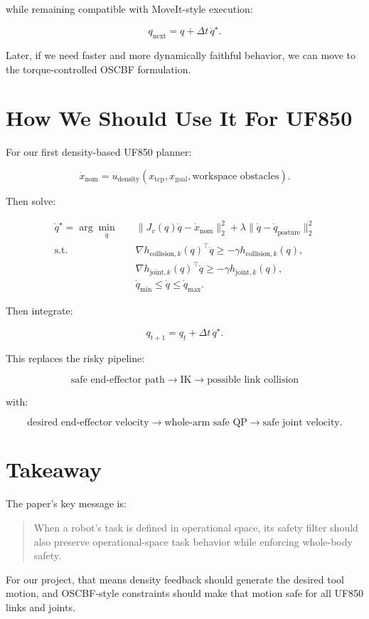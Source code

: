 \documentclass[11pt]{article}
\begin{document}
while remaining compatible with MoveIt-style execution:

\[
q_{\mathrm{next}} = q + \Delta t\,\dot{q}^{\star}.
\]

Later, if we need faster and more dynamically faithful behavior, we can move to
the torque-controlled OSCBF formulation.

\section{How We Should Use It For UF850}

For our first density-based UF850 planner:

\[
\dot{x}_{\mathrm{nom}}
= u_{\mathrm{density}}(x_{\mathrm{tcp}}, x_{\mathrm{goal}}, \text{workspace obstacles}).
\]

Then solve:

\[
\begin{aligned}
\dot{q}^{\star}
= \arg\min_{\dot{q}} \quad
& \|J_v(q)\dot{q} - \dot{x}_{\mathrm{nom}}\|_2^2
 + \lambda \|\dot{q} - \dot{q}_{\mathrm{posture}}\|_2^2 \\
\text{s.t.} \quad
& \nabla h_{\mathrm{collision},k}(q)^\top \dot{q}
  \ge -\gamma h_{\mathrm{collision},k}(q), \\
& \nabla h_{\mathrm{joint},k}(q)^\top \dot{q}
  \ge -\gamma h_{\mathrm{joint},k}(q), \\
& \dot{q}_{\min} \le \dot{q} \le \dot{q}_{\max}.
\end{aligned}
\]

Then integrate:

\[
q_{t+1} = q_t + \Delta t \, \dot{q}^{\star}.
\]

This replaces the risky pipeline:

\[
\text{safe end-effector path} \rightarrow \text{IK} \rightarrow
\text{possible link collision}
\]

with:

\[
\text{desired end-effector velocity} \rightarrow
\text{whole-arm safe QP} \rightarrow
\text{safe joint velocity}.
\]

\section{Takeaway}

The paper's key message is:

\begin{quote}
When a robot's task is defined in operational space, its safety filter should
also preserve operational-space task behavior while enforcing whole-body safety.
\end{quote}

For our project, that means density feedback should generate the desired tool
motion, and OSCBF-style constraints should make that motion safe for all UF850
links and joints.
\end{document}
